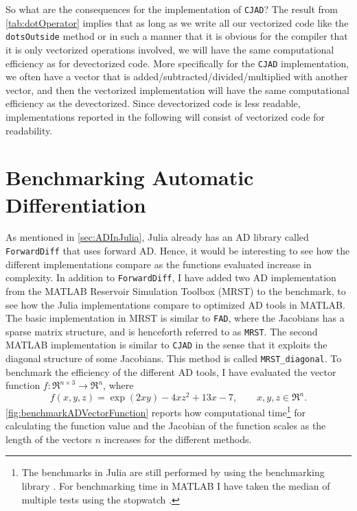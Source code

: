 So what are the consequences for the implementation of \texttt{CJAD}? The result from \autoref{tab:dotOperator} implies that as long as we write all our vectorized code like the \texttt{dotsOutside} method or in such a manner that it is obvious for the compiler that it is only vectorized operations involved, we will have the same computational efficiency as for devectorized code. More specifically for the \texttt{CJAD} implementation, we often have a vector that is added/subtracted/divided/multiplied with another vector, and then the vectorized implementation will have the same computational efficiency as the devectorized. Since devectorized code is less readable,  implementations reported in the following will consist of vectorized code for readability.

\section{Benchmarking Automatic Differentiation}
As mentioned in \autoref{sec:ADInJulia}, Julia already has an AD library called \texttt{ForwardDiff} \citep{ForwardDiff} that uses forward AD. Hence, it would be interesting to see how the different implementations compare as the functions evaluated increase in complexity. In addition to \texttt{ForwardDiff}, I have added two AD implementation from the MATLAB Reservoir Simulation Toolbox (MRST) \citep{mrstHomepage} to the benchmark, to see how the Julia implementations compare to optimized AD tools in MATLAB. The basic implementation in MRST is similar to \texttt{FAD}, where the Jacobians has a sparse matrix structure, and is henceforth referred to as \texttt{MRST}. The second MATLAB implementation is similar to \texttt{CJAD} in the sense that it exploits the diagonal structure of some Jacobians. This method is called \texttt{MRST\_diagonal}. To benchmark the efficiency of the different AD tools, I have evaluated the vector function $f: \Re^{n\times 3} \rightarrow \Re^n $, where
\begin{equation}
\label{eq:benchmarkFunction}
f(x,y,z)  = \exp(2xy) - 4xz^2 + 13x - 7, \qquad x,y,z \in \Re^n.
\end{equation}
\autoref{fig:benchmarkADVectorFunction} reports how computational time\footnote{The benchmarks in Julia are still performed by using the benchmarking library \emph{\cite{BenchmarkTools}}. For benchmarking time in MATLAB I have taken the median of multiple tests using the stopwatch \emph{\cite{TicToc}}.} for calculating the function value and the Jacobian of the function scales as the length of the vectors $n$ increases for the different methods.

